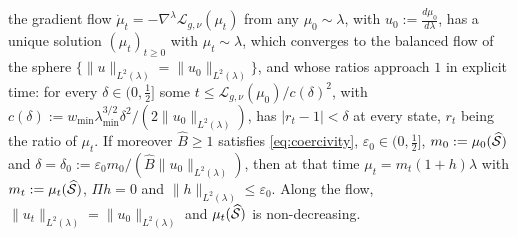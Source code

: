 \begin{proposition}
\begin{enumerate}
\begin{equation*}
    \end{equation*}
    the gradient flow $\dot\mu_t=-\nabla^{\lambda}\mathcal L_{g,\nu}(\mu_t)$ from any $\mu_0\sim\lambda$, with $u_0:=\frac{d\mu_0}{d\lambda}$, has a unique solution $(\mu_t)_{t\geq0}$ with $\mu_t\sim\lambda$, which converges to the balanced flow of the sphere $\{\|u\|_{L^2(\lambda)}=\|u_0\|_{L^2(\lambda)}\}$, and whose ratios approach $1$ in explicit time: for every $\delta\in(0,\frac12]$ some $t\leq\mathcal L_{g,\nu}(\mu_0)/c(\delta)^2$, with $c(\delta):=w_{\min}\lambda_{\min}^{3/2}\delta^2/(2\|u_0\|_{L^2(\lambda)})$, has $|r_t-1|<\delta$ at every state, $r_t$ being the ratio of $\mu_t$. If moreover $\widehat B\geq1$ satisfies \eqref{eq:coercivity}, $\varepsilon_0\in(0,\frac12]$, $m_0:=\mu_0(\widehat{\mathcal S})$ and $\delta=\delta_0:=\varepsilon_0m_0/(\widehat B\|u_0\|_{L^2(\lambda)})$, then at that time $\mu_t=m_t(1+h)\lambda$ with $m_t:=\mu_t(\widehat{\mathcal S})$, $\Pi h=0$ and $\|h\|_{L^2(\lambda)}\leq\varepsilon_0$. Along the flow, $\|u_t\|_{L^2(\lambda)}=\|u_0\|_{L^2(\lambda)}$ and $\mu_t(\widehat{\mathcal S})$ is non-decreasing.
\end{enumerate}
\end{proposition}

